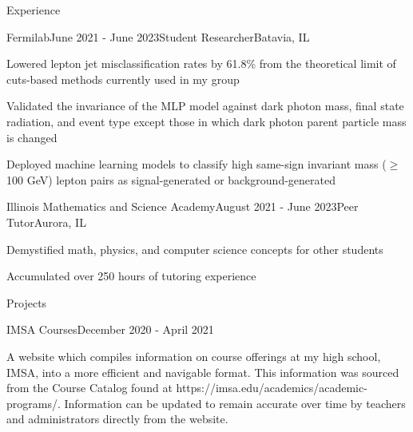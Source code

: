 \documentclass[
	11pt, %
]{resume} %
\begin{document}
\begin{rSection}{Experience}

	\begin{rSubsection}{Fermilab}{June 2021 - June 2023}{Student Researcher}{Batavia, IL}
		\item Lowered lepton jet misclassification rates by 61.8\% from the theoretical limit of cuts-based methods currently used in my group
        \item Validated the invariance of the MLP model against dark photon mass, final state radiation, and event type except those in which dark photon parent particle mass is changed
        \item Deployed machine learning models to classify high same-sign invariant mass ($\geq$ 100 GeV) lepton pairs as signal-generated or background-generated
	\end{rSubsection}

    \begin{rSubsection}{Illinois Mathematics and Science Academy}{August 2021 - June 2023}{Peer Tutor}{Aurora, IL}
        \item Demystified math, physics, and computer science concepts for other students
        \item Accumulated over 250 hours of tutoring experience
    \end{rSubsection}


\end{rSection}

\begin{rSection}{Projects}


    \begin{rSubsection}{IMSA Courses}{December 2020 - April 2021}{}{}
		\item A website which compiles information on course offerings at my high school, IMSA, into a more efficient and navigable format. This information was sourced from the Course Catalog found at https://imsa.edu/academics/academic-programs/. Information can be updated to remain accurate over time by teachers and administrators directly from the website.
	\end{rSubsection}
\end{rSection}
\end{document}
